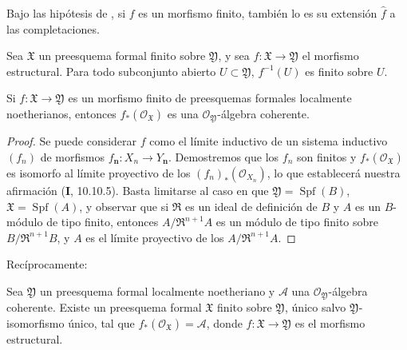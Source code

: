 \begin{corollary}[4.8.4]
\label{III.4.8.4}
\label{III.4.8.4-fr}
Bajo las hipótesis de , si $f$ es un morfismo
finito, también lo es su extensión $\widehat f$ a las
completaciones.
\end{corollary}

\begin{corollary}[4.8.5]
\label{III.4.8.5}
\label{III.4.8.5-fr}
Sea $\mathfrak X$ un preesquema formal finito sobre
$\mathfrak Y$, y sea
$f:\mathfrak X\to\mathfrak Y$ el morfismo estructural. Para
todo subconjunto abierto $U\subset\mathfrak Y$, $f^{-1}(U)$ es finito sobre $U$.
\end{corollary}

\begin{proposition}[4.8.6]
\label{III.4.8.6}
\label{III.4.8.6-fr}
Si $f:\mathfrak X\to\mathfrak Y$ es un morfismo finito de preesquemas
formales localmente noetherianos, entonces
$f_*(\mathcal O_{\mathfrak X})$ es una
$\mathcal O_{\mathfrak Y}$-álgebra coherente.
\end{proposition}

\begin{proof}
Se puede considerar $f$ como el límite inductivo de un sistema inductivo
$(f_n)$ de morfismos $f_{\boldsymbol{n}}:X_n\to Y_{\boldsymbol{n}}$. Demostremos que los
$f_n$ son finitos y $f_*(\mathcal O_{\mathfrak X})$ es
isomorfo al límite proyectivo de los
$(f_n)_*(\mathcal O_{X_n})$, lo que establecerá nuestra afirmación (\textbf{I}, 10.10.5).
Basta limitarse al caso en que $\mathfrak Y=\operatorname{Spf}(B)$,
$\mathfrak X=\operatorname{Spf}(A)$, y observar que si $\mathfrak R$ es un ideal de definición
de $B$ y $A$ es un $B$-módulo de tipo finito, entonces
$A/\mathfrak R^{n+1}A$ es un módulo de tipo finito sobre
$B/\mathfrak R^{n+1}B$, y $A$ es el límite proyectivo de los
$A/\mathfrak R^{n+1}A$.
\end{proof}

Recíprocamente:

\begin{proposition}[4.8.7]
\label{III.4.8.7}
\label{III.4.8.7-fr}
Sea $\mathfrak Y$ un preesquema formal localmente noetheriano y
$\mathcal A$ una $\mathcal O_{\mathfrak Y}$-álgebra coherente. Existe
un preesquema formal $\mathfrak X$ finito sobre $\mathfrak Y$,
único salvo $\mathfrak Y$-isomorfismo único, tal que
$f_*(\mathcal O_{\mathfrak X})=\mathcal A$,
donde $f:\mathfrak X\to\mathfrak Y$ es el morfismo estructural.
\end{proposition}

